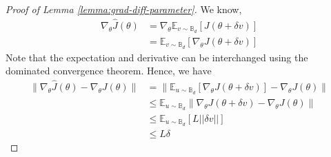 \begin{proof}[Proof of Lemma \ref{lemma:grad-diff-parameter}]
We know,
  \begin{align*}
    \nabla_\theta \hat{J}(\theta) &= \nabla_\theta\mathbb{E}_{v \sim \mathbb{B}_d}[J(\theta +
                             \delta v)] \nonumber \\
    &= \mathbb{E}_{v \sim \mathbb{B}_d}[\nabla_\theta J(\theta + \delta v)]
  \end{align*}
  Note that the expectation and derivative can be interchanged using
  the dominated convergence theorem. Hence, we have
  \begin{align*}
    \|\nabla_\theta \hat{J}(\theta) - \nabla_\theta J(\theta)\| &= \|\mathbb{E}_{u \sim
                                                  \mathbb{B}_d}[\nabla_\theta
                                                  J(\theta + \delta v)]
                                                  - \nabla_\theta J(\theta)\|
                                                  \nonumber \\
                                                &\leq \mathbb{E}_{u \sim
                                                  \mathbb{B}_d}\|\nabla_\theta
                                                  J(\theta + \delta v) -
                                                  \nabla_\theta J(\theta)\|
                                                  \nonumber \\
                                                &\leq \mathbb{E}_{u
                                                  \sim \mathbb{B}_d}[L
                                                  ||\delta v||]
                                                  \nonumber \\
                                                &\leq L \delta
  \end{align*}
\end{proof}

